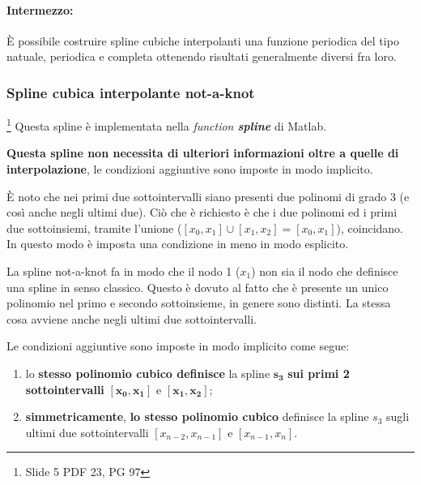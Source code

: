 \paragraph{Intermezzo:}È possibile costruire spline cubiche interpolanti una funzione periodica  del tipo natuale, periodica e completa ottenendo risultati generalmente diversi fra loro.

\subsubsection{Spline cubica interpolante not-a-knot}
\begin{remark}\footnote{Slide 5 PDF 23, PG 97}
    Questa spline è implementata nella \textit{function \textbf{spline}} di Matlab.
\end{remark}

\textbf{Questa spline non necessita di ulteriori informazioni oltre a quelle di interpolazione}, le condizioni aggiuntive sono  imposte in modo implicito. 

È noto che nei primi due sottointervalli siano presenti due polinomi di grado 3 (e così anche negli ultimi due). Ciò che è richiesto è che i due polinomi ed i primi due sottoinsiemi, tramite l'unione ($[x_0,x_1]\cup[x_1,x_2]=[x_0,x_1]$), coincidano. In questo modo è imposta una condizione in meno in modo esplicito. 

La spline not-a-knot fa in modo che il nodo 1 ($x_1$) non sia il nodo che definisce una spline in senso classico. Questo è dovuto al fatto che è presente un unico polinomio nel primo e secondo sottoinsieme, in genere sono distinti. La stessa cosa avviene anche negli ultimi due sottointervalli.

Le condizioni aggiuntive sono imposte in modo implicito come segue:
\begin{enumerate}
    \item lo \textbf{stesso polinomio cubico definisce} la spline $\boldsymbol{s_3}$ \textbf{sui primi 2 sottointervalli} $\boldsymbol{[x_0,x_1]}$ e $\boldsymbol{[x_1,x_2]}$;
    \item \footnotemark \textbf{simmetricamente}, \textbf{lo stesso polinomio cubico} definisce la spline $s_3$ sugli ultimi due sottointervalli $[x_{n-2},x_{n-1}]$ e $[x_{n-1},x_n]$.
\end{enumerate}

